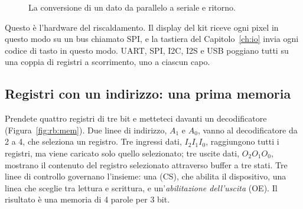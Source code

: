 \begin{figure}[htb]
\centering
{}
\caption{La conversione di un dato da parallelo a seriale e ritorno.}
\label{fig:rb:serpar}
\end{figure}

Questo è l'hardware del riscaldamento. Il display del kit riceve ogni pixel in
questo modo su un bus chiamato SPI, e la tastiera del Capitolo~\ref{ch:io}
invia ogni codice di tasto in questo modo. UART, SPI, I2C, I2S e USB poggiano
tutti su una coppia di registri a scorrimento, uno a ciascun capo.

\subsection{Registri con un indirizzo: una prima memoria}

Prendete quattro registri di tre bit e metteteci davanti un decodificatore
(Figura~\ref{fig:rb:mem}). Due linee di indirizzo, $A_1$ e $A_0$, vanno al
decodificatore da 2 a 4, che seleziona un registro. Tre ingressi dati,
$I_2I_1I_0$, raggiungono tutti i registri, ma viene caricato solo quello
selezionato; tre uscite dati, $O_2O_1O_0$, mostrano il contenuto del registro
selezionato attraverso buffer a tre stati. Tre linee di controllo governano
l'insieme: una   (CS), che abilita il
dispositivo, una linea che sceglie tra lettura e scrittura, e
un'\emph{abilitazione dell'uscita} (OE). Il risultato è una memoria di 4 parole
per 3 bit.

